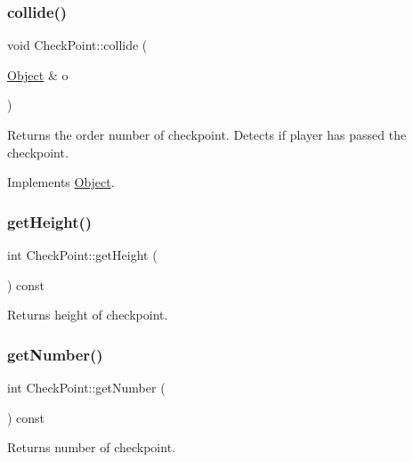 \subsubsection{\texorpdfstring{collide()}{collide()}}
{\footnotesize\ttfamily void Check\+Point\+::collide (\begin{DoxyParamCaption}\item[{\hyperlink{classObject}{Object} \&}]{o }\end{DoxyParamCaption})\hspace{0.3cm}{\ttfamily [virtual]}}

Returns the order number of checkpoint. Detects if player has passed the checkpoint. 

Implements \hyperlink{classObject}{Object}.

\hypertarget{classCheckPoint_a5356134c7455dac27e72dd144642e8ec}{}\label{classCheckPoint_a5356134c7455dac27e72dd144642e8ec} 
\subsubsection{\texorpdfstring{get\+Height()}{getHeight()}}
{\footnotesize\ttfamily int Check\+Point\+::get\+Height (\begin{DoxyParamCaption}{ }\end{DoxyParamCaption}) const\hspace{0.3cm}{\ttfamily [inline]}}

Returns height of checkpoint. \hypertarget{classCheckPoint_a22dca0111d35b2182b825ea6f03f94ed}{}\label{classCheckPoint_a22dca0111d35b2182b825ea6f03f94ed} 
\subsubsection{\texorpdfstring{get\+Number()}{getNumber()}}
{\footnotesize\ttfamily int Check\+Point\+::get\+Number (\begin{DoxyParamCaption}{ }\end{DoxyParamCaption}) const\hspace{0.3cm}{\ttfamily [inline]}}

Returns number of checkpoint. \hypertarget{classCheckPoint_a6d0ba1960662239fe108211f3787ca12}{}\label{classCheckPoint_a6d0ba1960662239fe108211f3787ca12} 
